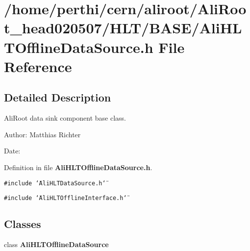 \section{/home/perthi/cern/aliroot/Ali\-Root\_\-head020507/HLT/BASE/Ali\-HLTOffline\-Data\-Source.h File Reference}
\label{AliHLTOfflineDataSource_8h}


\subsection{Detailed Description}
Ali\-Root data sink component base class. 

\begin{Desc}
\item[Author:]Matthias Richter \end{Desc}
\begin{Desc}
\item[Date:]\end{Desc}


Definition in file {\bf Ali\-HLTOffline\-Data\-Source.h}.

{\tt \#include \char`\"{}Ali\-HLTData\-Source.h\char`\"{}}\par
{\tt \#include \char`\"{}Ali\-HLTOffline\-Interface.h\char`\"{}}\par
\subsection*{Classes}
\begin{CompactItemize}
\item 
class {\bf Ali\-HLTOffline\-Data\-Source}
\end{CompactItemize}
